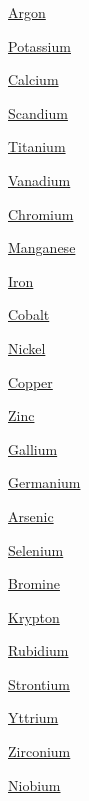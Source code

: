 \begin{DoxyCompactItemize}
\item 
\mbox{\hyperlink{group___isotope_const-_argon}{Argon}}
\item 
\mbox{\hyperlink{group___isotope_const-_potassium}{Potassium}}
\item 
\mbox{\hyperlink{group___isotope_const-_calcium}{Calcium}}
\item 
\mbox{\hyperlink{group___isotope_const-_scandium}{Scandium}}
\item 
\mbox{\hyperlink{group___isotope_const-_titanium}{Titanium}}
\item 
\mbox{\hyperlink{group___isotope_const-_vanadium}{Vanadium}}
\item 
\mbox{\hyperlink{group___isotope_const-_chromium}{Chromium}}
\item 
\mbox{\hyperlink{group___isotope_const-_manganese}{Manganese}}
\item 
\mbox{\hyperlink{group___isotope_const-_iron}{Iron}}
\item 
\mbox{\hyperlink{group___isotope_const-_cobalt}{Cobalt}}
\item 
\mbox{\hyperlink{group___isotope_const-_nickel}{Nickel}}
\item 
\mbox{\hyperlink{group___isotope_const-_copper}{Copper}}
\item 
\mbox{\hyperlink{group___isotope_const-_zinc}{Zinc}}
\item 
\mbox{\hyperlink{group___isotope_const-_gallium}{Gallium}}
\item 
\mbox{\hyperlink{group___isotope_const-_germanium}{Germanium}}
\item 
\mbox{\hyperlink{group___isotope_const-_arsenic}{Arsenic}}
\item 
\mbox{\hyperlink{group___isotope_const-_selenium}{Selenium}}
\item 
\mbox{\hyperlink{group___isotope_const-_bromine}{Bromine}}
\item 
\mbox{\hyperlink{group___isotope_const-_krypton}{Krypton}}
\item 
\mbox{\hyperlink{group___isotope_const-_rubidium}{Rubidium}}
\item 
\mbox{\hyperlink{group___isotope_const-_strontium}{Strontium}}
\item 
\mbox{\hyperlink{group___isotope_const-_yttrium}{Yttrium}}
\item 
\mbox{\hyperlink{group___isotope_const-_zirconium}{Zirconium}}
\item 
\mbox{\hyperlink{group___isotope_const-_niobium}{Niobium}}
\item 

\end{DoxyCompactItemize}
